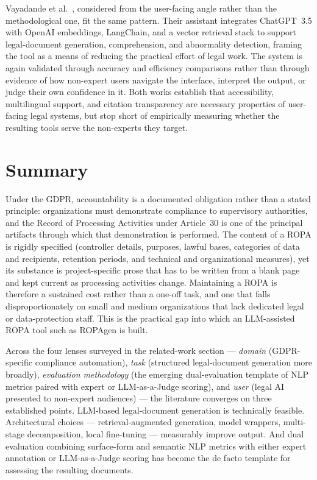 Vayadande et al.~\cite{vayadandeAIPoweredLegalDocumentation2024}, considered from the user-facing angle rather than the methodological one, fit the same pattern. Their assistant integrates ChatGPT~3.5 with OpenAI embeddings, LangChain, and a vector retrieval stack to support legal-document generation, comprehension, and abnormality detection, framing the tool as a means of reducing the practical effort of legal work. The system is again validated through accuracy and efficiency comparisons rather than through evidence of how non-expert users navigate the interface, interpret the output, or judge their own confidence in it. Both works establish that accessibility, multilingual support, and citation transparency are necessary properties of user-facing legal systems, but stop short of empirically measuring whether the resulting tools serve the non-experts they target.


\section{Summary}
\label{sec:background-summary}

Under the GDPR, accountability is a documented obligation rather than a stated principle: organizations must demonstrate compliance to supervisory authorities, and the Record of Processing Activities under Article~30 is one of the principal artifacts through which that demonstration is performed. The content of a ROPA is rigidly specified (controller details, purposes, lawful bases, categories of data and recipients, retention periods, and technical and organizational measures), yet its substance is project-specific prose that has to be written from a blank page and kept current as processing activities change. Maintaining a ROPA is therefore a sustained cost rather than a one-off task, and one that falls disproportionately on small and medium organizations that lack dedicated legal or data-protection staff. This is the practical gap into which an LLM-assisted ROPA tool such as ROPAgen is built.

Across the four lenses surveyed in the related-work section --- \emph{domain} (GDPR-specific compliance automation), \emph{task} (structured legal-document generation more broadly), \emph{evaluation methodology} (the emerging dual-evaluation template of NLP metrics paired with expert or LLM-as-a-Judge scoring), and \emph{user} (legal AI presented to non-expert audiences) --- the literature converges on three established points. LLM-based legal-document generation is technically feasible. Architectural choices --- retrieval-augmented generation, model wrappers, multi-stage decomposition, local fine-tuning --- measurably improve output. And dual evaluation combining surface-form and semantic NLP metrics with either expert annotation or LLM-as-a-Judge scoring has become the de facto template for assessing the resulting documents.

